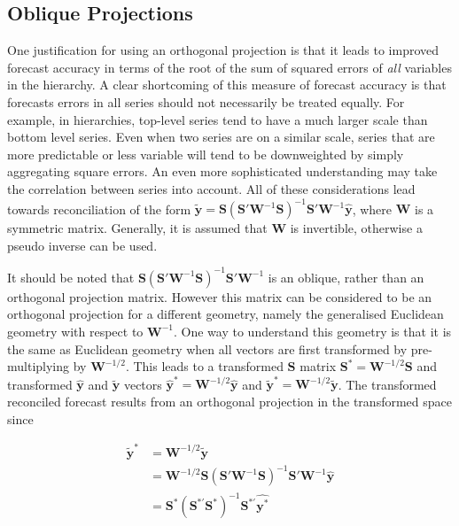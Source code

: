 \documentclass[12pt]{article}
\theoremstyle{definition}
\theoremstyle{property}
\begin{document}
	\subsection{Oblique Projections}
	
	One justification for using an orthogonal projection is that it leads to improved forecast accuracy in terms of the root of the sum of squared errors of {\em all} variables in the hierarchy.  A clear shortcoming of this measure of forecast accuracy is that forecasts errors in all series should not necessarily be treated equally.  For example, in hierarchies, top-level series tend to have a much larger scale than bottom level series.  Even when two series are on a similar scale, series that are more predictable or less variable will tend to be downweighted by simply aggregating square errors.  An even more sophisticated understanding may take the correlation between series into account.  All of these considerations lead towards reconciliation of the form $\tilde{\bm{y}}=\bm{S}\left(\bm{S}'\bm{W}^{-1}\bm{S}\right)^{-1}\bm{S}'\bm{W}^{-1}\hat{\bm{y}}$, where $\bm{W}$ is a symmetric matrix.  Generally, it is assumed that $\bm{W}$ is invertible, otherwise a pseudo inverse can be used.
	
	It should be noted that  $\bm{S}\left(\bm{S}'\bm{W}^{-1}\bm{S}\right)^{-1}\bm{S}'\bm{W}^{-1}$ is an oblique, rather than an orthogonal projection matrix.  However this matrix can be considered to be an orthogonal projection for a different geometry, namely the generalised Euclidean geometry with respect to $\bm{W}^{-1}$.  One way to understand this geometry is that it is the same as Euclidean geometry when all vectors are first transformed by pre-multiplying by $\bm{W}^{-1/2}$.  This leads to a transformed $\bm{S}$ matrix $\bm{S}^*=\bm{W}^{-1/2}\bm{S}$ and transformed $\hat{\bm{y}}$ and $\tilde{\bm{y}}$ vectors $\hat{\bm{y}}^*=\bm{W}^{-1/2}\hat{\bm{y}}$ and $\tilde{\bm{y}}^*=\bm{W}^{-1/2}\tilde{\bm{y}}$.  The transformed reconciled forecast results from an orthogonal projection in the transformed space since 
	
	\begin{align}
	\tilde{\bm{y}}^*&=\bm{W}^{-1/2}\tilde{\bm{y}}\\&=\bm{W}^{-1/2}\bm{S}\left(\bm{S}'\bm{W}^{-1}\bm{S}\right)^{-1}\bm{S}'\bm{W}^{-1}\hat{\bm{y}}
	\\&=\bm{S}^*\left(\bm{S}^{*'}\bm{S}^*\right)^{-1}\bm{S}^{*'}\hat{\bm{y}^*}
	\end{align}
	
\end{document}

